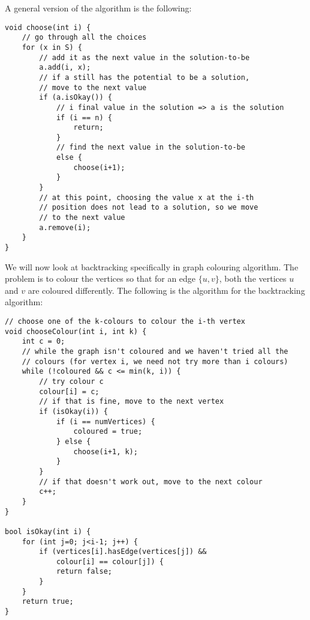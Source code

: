 \documentclass[a4paper, openany]{memoir}
\begin{document}
    A general version of the algorithm is the following:
\begin{lstlisting}[language=pseudocode]
void choose(int i) {
    // go through all the choices
    for (x in S) {
        // add it as the next value in the solution-to-be
        a.add(i, x);
        // if a still has the potential to be a solution, 
        // move to the next value
        if (a.isOkay()) {
            // i final value in the solution => a is the solution
            if (i == n) {
                return;
            } 
            // find the next value in the solution-to-be
            else {
                choose(i+1);
            }
        }
        // at this point, choosing the value x at the i-th 
        // position does not lead to a solution, so we move
        // to the next value
        a.remove(i);
    }
}
\end{lstlisting}

    We will now look at backtracking specifically in graph colouring algorithm. The problem is to colour the vertices so that for an edge $\{u, v\}$, both the vertices $u$ and $v$ are coloured differently. The following is the algorithm for the backtracking algorithm:
\begin{lstlisting}[language=pseudocode]
// choose one of the k-colours to colour the i-th vertex
void chooseColour(int i, int k) {
    int c = 0;
    // while the graph isn't coloured and we haven't tried all the 
    // colours (for vertex i, we need not try more than i colours)
    while (!coloured && c <= min(k, i)) {
        // try colour c
        colour[i] = c;
        // if that is fine, move to the next vertex
        if (isOkay(i)) {
            if (i == numVertices) {
                coloured = true;
            } else {
                choose(i+1, k);
            }
        }
        // if that doesn't work out, move to the next colour
        c++;
    }
}

bool isOkay(int i) {
    for (int j=0; j<i-1; j++) {
        if (vertices[i].hasEdge(vertices[j]) && 
            colour[i] == colour[j]) {
            return false;
        }
    }
    return true;
}
\end{lstlisting}
\end{document}
